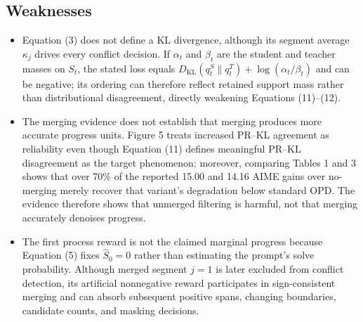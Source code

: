 \subsection*{Weaknesses}
\begin{itemize}
\item Equation (3) does not define a KL divergence, although its segment average $\kappa_j$ drives every conflict decision. If $\alpha_t$ and $\beta_t$ are the student and teacher masses on $S_t$, the stated loss equals $D_{\mathrm{KL}}(q_t^S\parallel q_t^T) + \log(\alpha_t/\beta_t)$ and can be negative; its ordering can therefore reflect retained support mass rather than distributional disagreement, directly weakening Equations (11)--(12).
\par{}
\begin{responsebox}[frametitle={Response to W1}]
\vspace*{2\baselineskip}
\end{responsebox}

\item The merging evidence does not establish that merging produces more accurate progress units. Figure 5 treats increased PR--KL agreement as reliability even though Equation (11) defines meaningful PR--KL disagreement as the target phenomenon; moreover, comparing Tables 1 and 3 shows that over 70\% of the reported 15.00 and 14.16 AIME gains over no-merging merely recover that variant's degradation below standard OPD. The evidence therefore shows that unmerged filtering is harmful, not that merging accurately denoises progress.
\par{}
\begin{responsebox}[frametitle={Response to W2}]
\vspace*{2\baselineskip}
\end{responsebox}

\item The first process reward is not the claimed marginal progress because Equation (5) fixes $\hat{S}_0 = 0$ rather than estimating the prompt's solve probability. Although merged segment $j = 1$ is later excluded from conflict detection, its artificial nonnegative reward participates in sign-consistent merging and can absorb subsequent positive spans, changing boundaries, candidate counts, and masking decisions.
\par{}
\begin{responsebox}[frametitle={Response to W3}]
\vspace*{2\baselineskip}
\end{responsebox}


\end{itemize}
